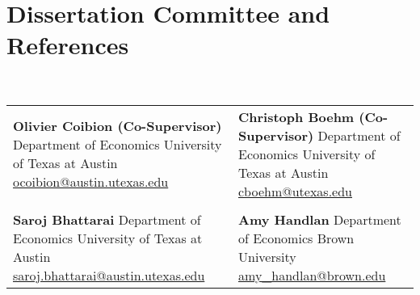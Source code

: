 \documentclass[a4paper, 10pt]{article}
\begin{document}
  \section{Dissertation Committee and References}
  ~\begin{tabular}{p{5cm} p{5.2cm}}
    \textbf{Olivier Coibion (Co-Supervisor)} \newline Department of Economics \newline University of Texas at Austin \newline \href{mailto:ocoibion@austin.utexas.edu}{ocoibion@austin.utexas.edu} & \textbf{Christoph Boehm (Co-Supervisor)} \newline Department of Economics \newline University of Texas at Austin \newline \href{mailto:cboehm@utexas.edu}{cboehm@utexas.edu}\\
    &\\
    \textbf{Saroj Bhattarai} \newline Department of Economics \newline University of Texas at Austin \newline \href{mailto:saroj.bhattarai@austin.utexas.edu}{saroj.bhattarai@austin.utexas.edu} & \textbf{Amy Handlan} \newline Department of Economics \newline Brown University \newline \href{mailto:amy\_handlan@brown.edu}{amy\_handlan@brown.edu}
  \end{tabular}
  \vspace*{0.25em}
\end{document}
